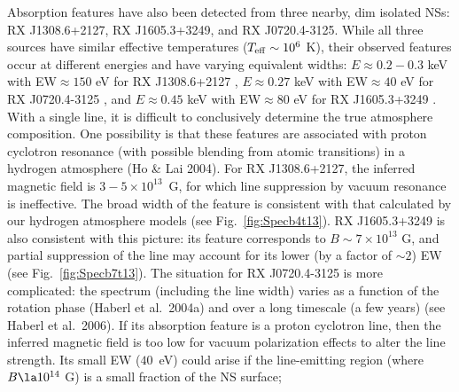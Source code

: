 \documentclass[useAMS,onecolumn,usenatbib,usegraphicx]{mn2e}
\begin{document}
Absorption features have also been detected from three nearby, dim
isolated NSs: RX J1308.6+2127, RX J1605.3+3249, and RX J0720.4-3125.
While all three sources have similar effective temperatures 
($T_{\rm eff}\sim 10^6$ K), their observed features occur at 
different energies and have varying equivalent widths:
$E\approx 0.2-0.3$ keV with EW$\approx 150$ eV for RX J1308.6+2127 
\citep[][]{Haberletal03a},
$E\approx 0.27$ keV with EW$\approx 40$ eV for RX J0720.4-3125 
\citep[][]{Haberletal04a}, and
$E\approx 0.45$ keV with EW$\approx 80$ eV for RX J1605.3+3249 
\citep[][]{vanKerkwijketal04a}.  
With a single line, it is difficult to conclusively determine the 
true atmosphere composition. 
One possibility is that these features are 
associated with proton cyclotron resonance (with possible
blending from atomic transitions) in a hydrogen atmosphere (Ho \& Lai 2004).
For RX J1308.6+2127, the inferred magnetic field is 
$3-5\times 10^{13}$~G,
for which line suppression by vacuum resonance is ineffective.
The broad width of the feature is consistent with that calculated by 
our hydrogen atmosphere models
(see Fig.~\ref{fig:Specb4t13}).  
RX J1605.3+3249 is also consistent with this picture: its feature 
corresponds to $B\sim 7\times 10^{13}$ G, and
partial suppression of the line may 
account for its lower (by a factor of $\sim 2$) EW
(see Fig.~\ref{fig:Specb7t13}).  
The situation for RX J0720.4-3125 is more complicated: the spectrum
(including the line width) varies as a function of the rotation 
phase (Haberl et al.~2004a)
and over a long timescale (a few years) (see Haberl et al.~2006).
If its absorption feature is a proton cyclotron line, then the 
inferred magnetic field 
is too low for vacuum polarization effects to alter the line strength. 
Its small EW ($40$~eV) could arise if the line-emitting region 
(where $B\la 10^{14}$ G) is a small fraction of the NS surface; 
\end{document}
